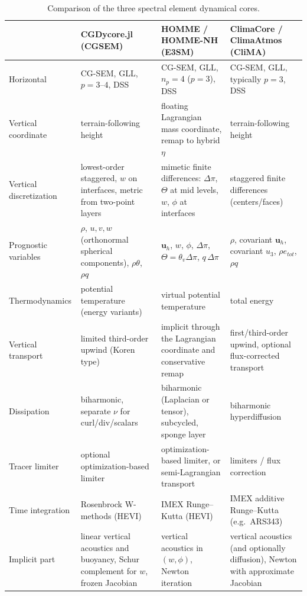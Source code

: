 \documentclass[11pt,a4paper]{article}
\begin{document}
\begin{table}[h]
\centering\small
\begin{tabularx}{\textwidth}{>{\raggedright\arraybackslash}p{2.6cm}LLL}
\toprule
 & CGDycore.jl (CGSEM) & HOMME / HOMME-NH (E3SM) & ClimaCore / ClimaAtmos (CliMA)\\
\midrule
Horizontal & CG-SEM, GLL, $p=3$--$4$, DSS & CG-SEM, GLL, $n_p=4$ ($p=3$), DSS
  & CG-SEM, GLL, typically $p=3$, DSS\\
Vertical coordinate & terrain-following height & floating Lagrangian
  mass coordinate, remap to hybrid $\eta$ & terrain-following height\\
Vertical discretization & lowest-order staggered, $w$ on interfaces,
  metric from two-point layers
  & mimetic finite differences: $\Delta\pi$, $\Theta$ at mid levels, $w$,
  $\phi$ at interfaces
  & staggered finite differences (centers/faces)\\
Prognostic variables & $\rho$, $u,v,w$ (orthonormal spherical components), $\rho\theta$, $\rho q$
  & $\bm u_h$, $w$, $\phi$, $\Delta\pi$, $\Theta=\theta_v\Delta\pi$, $q\,\Delta\pi$
  & $\rho$, covariant $\bm u_h$, covariant $u_3$, $\rho e_{tot}$, $\rho q$\\
Thermodynamics & potential temperature (energy variants)
  & virtual potential temperature & total energy\\
Vertical transport & limited third-order upwind (Koren type)
  & implicit through the Lagrangian coordinate and conservative remap
  & first/third-order upwind, optional flux-corrected transport\\
Dissipation & biharmonic, separate $\nu$ for curl/div/scalars
  & biharmonic (Laplacian or tensor), subcycled, sponge layer
  & biharmonic hyperdiffusion\\
Tracer limiter & optional optimization-based limiter
  & optimization-based limiter, or semi-Lagrangian transport
  & limiters / flux correction\\
Time integration & Rosenbrock W-methods (HEVI)
  & IMEX Runge--Kutta (HEVI)
  & IMEX additive Runge--Kutta (e.g.\ ARS343)\\
Implicit part & linear vertical acoustics and buoyancy, Schur complement
  for $w$, frozen Jacobian
  & vertical acoustics in $(w,\phi)$, Newton iteration
  & vertical acoustics (and optionally diffusion), Newton with approximate
  Jacobian\\
\bottomrule
\end{tabularx}
\caption{Comparison of the three spectral element dynamical cores.}
\label{tab:comp}
\end{table}
\end{document}
